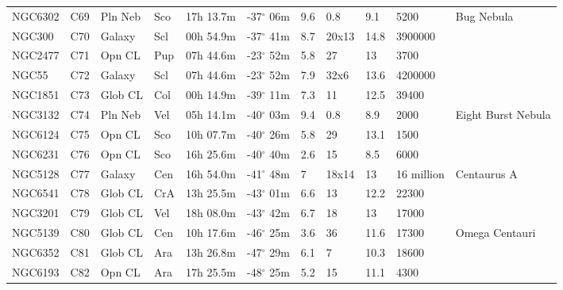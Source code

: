 \begin{longtable}{@{}lllllllllll@{}}
NGC6302    & C69           & Pln Neb & Sco & 17h 13.7m & -37$^{\circ}$ 06m & 9.6  & 0.8            & 9.1  & 5200          & Bug Nebula                      \\
NGC300     & C70           & Galaxy  & Scl & 00h 54.9m & -37$^{\circ}$ 41m & 8.7  & 20x13          & 14.8 & 3900000       &                                 \\
NGC2477    & C71           & Opn CL  & Pup & 07h 44.6m & -23$^{\circ}$ 52m & 5.8  & 27             & 13   & 3700          &                                 \\
NGC55      & C72           & Galaxy  & Scl & 07h 44.6m & -23$^{\circ}$ 52m & 7.9  & 32x6           & 13.6 & 4200000       &                                 \\
NGC1851    & C73           & Glob CL & Col & 00h 14.9m & -39$^{\circ}$ 11m & 7.3  & 11             & 12.5 & 39400         &                                 \\
NGC3132    & C74           & Pln Neb & Vel & 05h 14.1m & -40$^{\circ}$ 03m & 9.4  & 0.8            & 8.9  & 2000          & Eight Burst Nebula              \\
NGC6124    & C75           & Opn CL  & Sco & 10h 07.7m & -40$^{\circ}$ 26m & 5.8  & 29             & 13.1 & 1500          &                                 \\
NGC6231    & C76           & Opn CL  & Sco & 16h 25.6m & -40$^{\circ}$ 40m & 2.6  & 15             & 8.5  & 6000          &                                 \\
NGC5128    & C77           & Galaxy  & Cen & 16h 54.0m & -41$^{\circ}$ 48m & 7    & 18x14          & 13   & 16 million    & Centaurus A                     \\
NGC6541    & C78           & Glob CL & CrA & 13h 25.5m & -43$^{\circ}$ 01m & 6.6  & 13             & 12.2 & 22300         &                                 \\
NGC3201    & C79           & Glob CL & Vel & 18h 08.0m & -43$^{\circ}$ 42m & 6.7  & 18             & 13   & 17000         &                                 \\
NGC5139    & C80           & Glob CL & Cen & 10h 17.6m & -46$^{\circ}$ 25m & 3.6  & 36             & 11.6 & 17300         & Omega Centauri                  \\
NGC6352    & C81           & Glob CL & Ara & 13h 26.8m & -47$^{\circ}$ 29m & 6.1  & 7              & 10.3 & 18600         &                                 \\
NGC6193    & C82           & Opn CL  & Ara & 17h 25.5m & -48$^{\circ}$ 25m & 5.2  & 15             & 11.1 & 4300          &                                 \\

\end{longtable}
